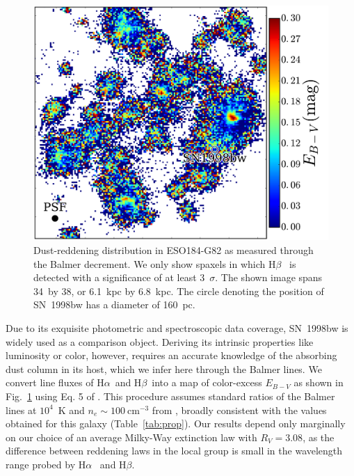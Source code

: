 \documentclass[traditabstract, referee]{aa}
\newcommand{\hb}{H$\beta$}
\newcommand{\ha}{H$\alpha$}
\begin{document}
\begin{figure}
\includegraphics[angle=0, width=0.99\columnwidth]{Figs/MUSE_SN1998bw_EB-V.pdf}
\caption{Dust-reddening distribution in ESO184-G82 as measured through the Balmer decrement. We only show spaxels in which \hb~ is detected with a significance of at least 3~$\sigma$. The shown image spans 34\arcsec~by 38\arcsec, or 6.1~kpc by 6.8~kpc. The circle denoting the position of SN~1998bw has a {diameter} of 160~pc.}
\label{fig:ebv}
\end{figure}

Due to its exquisite photometric and spectroscopic data coverage, SN~1998bw is widely used as a comparison object. Deriving its intrinsic properties like luminosity or color, however, requires an accurate knowledge of the absorbing dust column in its host, which we infer here through the Balmer lines. We convert line fluxes of \ha~and \hb~into a map of color-excess $E_{B-V}$ as shown in Fig.~\ref{fig:ebv} using Eq. 5 of \citet{2015A&A...581A.125K}. This procedure assumes standard ratios of the Balmer lines at $10^4$~K and $n_e\sim100~\mathrm{cm}^{-3}$ from \citet{1989agna.book.....O}, broadly consistent with the values obtained for this galaxy (Table~\ref{tab:prop}). Our results depend only marginally on our choice of an average Milky-Way extinction law \citep{1992ApJ...395..130P} with $R_V=3.08$, as the difference between reddening laws in the local group is small in the wavelength range probed by \ha~ and \hb. 
\end{document}
